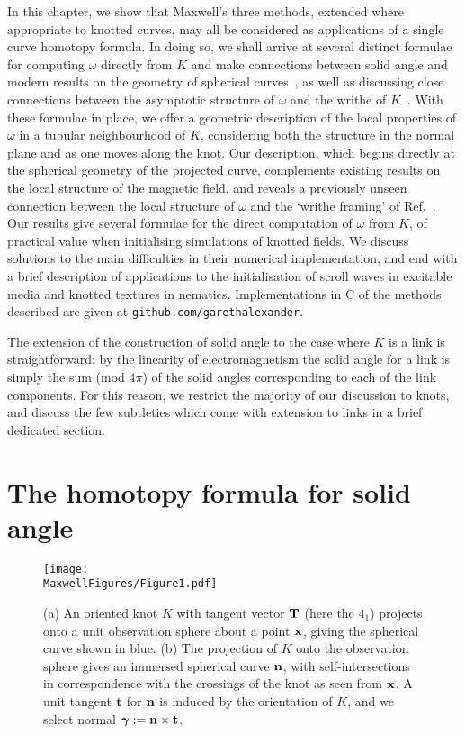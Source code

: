     In this chapter, we show that Maxwell's three methods, extended where appropriate to knotted curves, may all be considered as applications of a single curve homotopy formula. In doing so, we shall arrive at several distinct formulae for computing $\omega$ directly from $K$ and make connections between solid angle and modern results on the geometry of spherical curves~\citep{Levi1994,Arnold1995}, as well as discussing close connections between the asymptotic structure of $\omega$ and the writhe of $K$~\citep{Fuller1978,Dennis2005}. With these formulae in place, we offer a geometric description of the local properties of $\omega$ in a tubular neighbourhood of $K$, considering both the structure in the normal plane and as one moves along the knot. Our description, which begins directly at the spherical geometry of the projected curve, complements existing results on the local structure of the magnetic field, and reveals a previously unseen connection between the local structure of $\omega$ and the `writhe framing' of Ref.~\citep{Dennis2005}. 
    Our results give several formulae for the direct computation of $\omega$ from $K$, of practical value when initialising simulations of knotted fields. We discuss solutions to the main difficulties in their numerical implementation, and end with a brief description of applications to the initialisation of scroll waves in excitable media and knotted textures in nematics. Implementations in C of the methods described are given at \verb=github.com/garethalexander=.

    The extension of the construction of solid angle to the case where $K$ is a link is straightforward: by the linearity of electromagnetism the solid angle for a link is simply the sum (mod $4\pi$) of the solid angles corresponding to each of the link components. For this reason, we restrict the majority of our discussion to knots, and discuss the few subtleties which come with extension to links in a brief dedicated section.

    \section{The homotopy formula for solid angle} 
    \label{sec:CurveIsotopies}

    \begin{figure}[t]
        \centering	
        \texttt{[image: \\MaxwellFigures/Figure1.pdf]}
        \caption[Spherical knot projection onto an observation point.]{(a) An oriented knot $K$ with tangent vector $\bf T$ (here the $4_1$) projects onto a unit observation sphere about a point $\bf x$, giving the spherical curve shown in blue. (b) The projection of $K$ onto the observation sphere gives an immersed spherical curve $\bf n$, with self-intersections in correspondence with the crossings of the knot as seen from $\bf x$. A unit tangent $\bf t$ for $\bf n$ is induced by the orientation of $K$, and we select normal $\boldsymbol{\gamma} := \bf n \times \bf t$.}
        \label{fig:Knot} 
    \end{figure}

